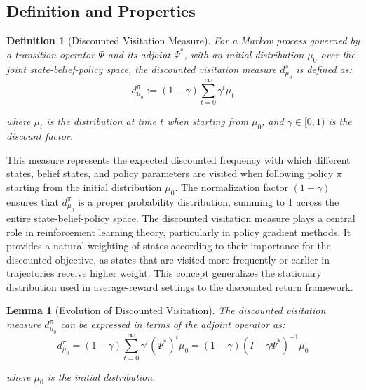 \documentclass[a4paper,12pt]{report}
\newtheorem{lemma}{Lemma}
\newtheorem{definition}{Definition}
\begin{document}
\subsection{Definition and Properties}
\begin{definition}[Discounted Visitation Measure]
    For a Markov process governed by a transition operator $\Psi$ and its adjoint $\Psi
        ^{*}$, with an initial distribution $\mu_{0}$ over the joint state-belief-policy
    space, the discounted visitation measure $d^{\pi}_{\mu_0}$ is defined as:
    \begin{equation}
        d^{\pi}_{\mu_0}:= (1-\gamma) \sum_{t=0}^{\infty}\gamma^{t} \mu_{t}
    \end{equation}

    where $\mu_{t}$ is the distribution at time $t$ when starting from $\mu_{0}$,
    and $\gamma \in [0, 1)$ is the discount factor.
\end{definition}This measure represents the expected discounted frequency with which
different states, belief states, and policy parameters are visited when following
policy $\pi$ starting from the initial distribution $\mu_{0}$. The normalization
factor $(1-\gamma)$ ensures that $d^{\pi}_{\mu_0}$ is a proper probability
distribution, summing to 1 across the entire state-belief-policy space. The discounted
visitation measure plays a central role in reinforcement learning theory,
particularly in policy gradient methods. It provides a natural weighting of states
according to their importance for the discounted objective, as states that are
visited more frequently or earlier in trajectories receive higher weight. This concept
generalizes the stationary distribution used in average-reward settings to the discounted
return framework.
\begin{lemma}[Evolution of Discounted Visitation]
    The discounted visitation measure $d^{\pi}_{\mu_0}$ can be expressed in terms of
    the adjoint operator as:
    \begin{equation}
        d^{\pi}_{\mu_0}= (1-\gamma) \sum_{t=0}^{\infty}\gamma^{t} (\Psi^{*})^{t} \mu_{0}
        = (1-\gamma)(I - \gamma\Psi^{*})^{-1}\mu_{0}
    \end{equation}

    where $\mu_{0}$ is the initial distribution.
\end{lemma}
\end{document}
